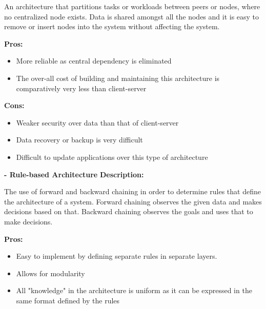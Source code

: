 \documentclass{article}
\begin{document}
\begin{enumerate}
		\begin{flushleft}
			An architecture that partitions tasks or workloads between peers or nodes, where no centralized node exists.
			Data is shared amongst all the nodes and it is easy to remove or insert nodes into the system without 
			affecting the system.
			\newline\newline\newline
			
		\end{flushleft}
		\newline\newline
		\textbf{Pros:}
		\begin{itemize}
			\item More reliable as central dependency is eliminated
			\item The over-all cost of building and maintaining this architecture is comparatively very less than client-server
		\end{itemize}
		\newline\newline
		\textbf{Cons:}
		\begin{itemize}
			\item Weaker security over data than that of client-server
			\item Data recovery or backup is very difficult
			\item Difficult to update applications over this type of architecture
		\end{itemize}
		
		
		
		
		
		
		\newline\newline
		\textbf{- Rule-based Architecture}
		\newline\newline
		\textbf{Description:}
		
		\begin{flushleft}
			The use of forward and backward chaining in order to determine rules that define the architecture of a system.
			Forward chaining observes the given data and makes decisions based on that. Backward chaining observes the goals
			and uses that to make decisions.				
		\end{flushleft}
		
		\textbf{Pros:}
		\begin{itemize}
			\item Easy to implement by defining separate rules in separate layers.
			\item Allows for modularity
			\item All "knowledge" in the architecture is uniform as it can be expressed in the same format defined by the rules
		\end{itemize}
		

\end{enumerate}
\end{document}
